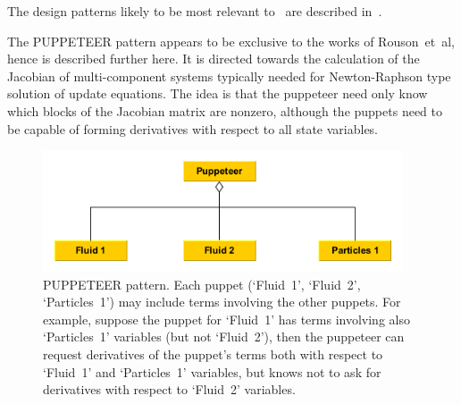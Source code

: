 The design patterns likely to be most relevant to \nep \ are described
in~\cite{y2re332,y2re333}.

The PUPPETEER pattern appears to be
exclusive to the works of Rouson~et~al, hence is described further here.
It is directed towards the calculation of the Jacobian of multi-component
systems typically needed for Newton-Raphson type solution of update equations.
The idea is that the puppeteer need only know which blocks of the Jacobian
matrix are nonzero, although the puppets need to be capable of forming derivatives
with respect to all state variables.
\begin{figure}
\centerline{\includegraphics[width=0.95\textwidth]{./pics/puppeteer_wab.png}}
\caption{
PUPPETEER pattern. Each puppet (`Fluid~1', `Fluid~2', `Particles~1') may include terms  involving 
the other puppets. For example, suppose the puppet for `Fluid~1' has terms involving also `Particles~1'
variables (but not `Fluid~2'), then the puppeteer can request derivatives of the puppet's terms both
with respect to `Fluid~1' and `Particles~1' variables, but knows not to ask for derivatives with respect
to `Fluid~2' variables.
\label{fig:puppeteer_wab}}
\end{figure}

